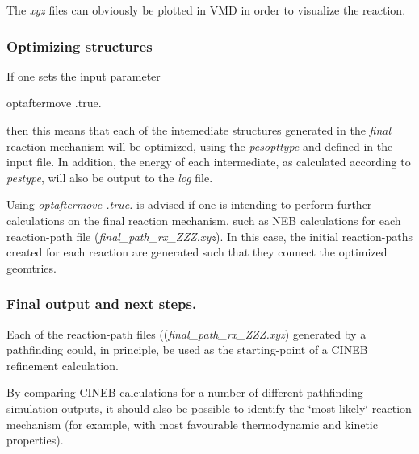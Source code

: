 The {\itshape xyz} files can obviously be plotted in V\+MD in order to visualize the reaction.

\subsubsection*{Optimizing structures}

If one sets the input parameter \begin{DoxyVerb}    optaftermove .true.
\end{DoxyVerb}


then this means that each of the intemediate structures generated in the {\itshape final} reaction mechanism will be optimized, using the {\itshape pesopttype} and defined in the input file. In addition, the energy of each intermediate, as calculated according to {\itshape pestype}, will also be output to the {\itshape log} file.

Using {\itshape optaftermove .true.} is advised if one is intending to perform further calculations on the final reaction mechanism, such as N\+EB calculations for each reaction-\/path file ({\itshape final\+\_\+path\+\_\+rx\+\_\+\+Z\+Z\+Z.\+xyz}). In this case, the initial reaction-\/paths created for each reaction are generated such that they connect the optimized geomtries.

\subsubsection*{Final output and next steps.}


\begin{DoxyItemize}
\item Each of the reaction-\/path files (({\itshape final\+\_\+path\+\_\+rx\+\_\+\+Z\+Z\+Z.\+xyz}) generated by a pathfinding could, in principle, be used as the starting-\/point of a C\+I\+N\+EB refinement calculation.
\item By comparing C\+I\+N\+EB calculations for a number of different pathfinding simulation outputs, it should also be possible to identify the \char`\"{}most likely\char`\"{} reaction mechanism (for example, with most favourable thermodynamic and kinetic properties). 
\end{DoxyItemize}